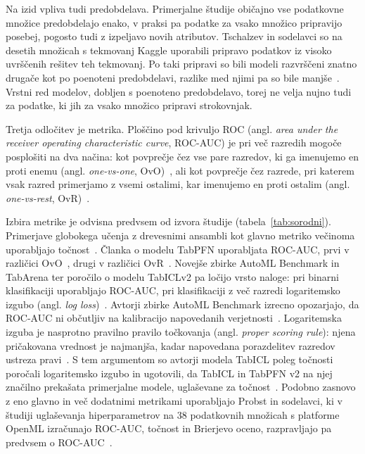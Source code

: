 \documentclass[a4paper,12pt,openright]{book}
\begin{document}
Na izid vpliva tudi predobdelava. Primerjalne študije običajno vse podatkovne
množice predobdelajo enako, v praksi pa podatke za vsako množico pripravijo
posebej, pogosto tudi z izpeljavo novih atributov. Tschalzev in sodelavci so
na desetih množicah s tekmovanj Kaggle uporabili pripravo podatkov iz visoko
uvrščenih rešitev teh tekmovanj. Po taki pripravi so bili modeli razvrščeni
znatno drugače kot po poenoteni predobdelavi, razlike med njimi pa so bile
manjše~\cite{tschalzev2024data}. Vrstni red modelov, dobljen s poenoteno
predobdelavo, torej ne velja nujno tudi za podatke, ki jih za vsako množico
pripravi strokovnjak.

Tretja odločitev je metrika. Ploščino pod krivuljo ROC (angl. \emph{area under the
receiver operating characteristic curve}, ROC-AUC) je pri več razredih mogoče
posplošiti na dva načina: kot povprečje čez vse pare razredov, ki ga
imenujemo en proti enemu (angl. \emph{one-vs-one}, OvO)~\cite{hand2001simple},
ali kot povprečje čez razrede, pri katerem vsak razred primerjamo z vsemi
ostalimi, kar imenujemo en proti ostalim (angl. \emph{one-vs-rest},
OvR)~\cite{fawcett2006introduction}.

Izbira metrike je odvisna predvsem od izvora študije
(tabela~\ref{tab:sorodni}).
Primerjave globokega učenja z drevesnimi ansambli kot glavno metriko večinoma
uporabljajo točnost~\cite{grinsztajn2022why,mcelfresh2023neural,ye2024closer}.
Članka o modelu TabPFN uporabljata ROC-AUC, prvi v različici
OvO~\cite{hollmann2023tabpfn}, drugi v različici
OvR~\cite{hollmann2025tabpfn}. Novejše zbirke AutoML Benchmark in TabArena ter
poročilo o modelu TabICLv2 pa ločijo vrsto naloge: pri binarni klasifikaciji
uporabljajo ROC-AUC, pri klasifikaciji z več razredi logaritemsko izgubo
(angl. \emph{log
loss})~\cite{gijsbers2024amlb,erickson2025tabarena,qu2026tabiclv2}. Avtorji
zbirke AutoML Benchmark izrecno opozarjajo, da ROC-AUC ni občutljiv na
kalibracijo napovedanih
verjetnosti~\cite{gijsbers2024amlb}. Logaritemska
izguba je nasprotno pravilno pravilo točkovanja (angl. \emph{proper scoring
rule}): njena pričakovana vrednost je najmanjša, kadar napovedana porazdelitev
razredov ustreza pravi~\cite{gneiting2007strictly}. S tem argumentom so avtorji
modela TabICL poleg točnosti poročali logaritemsko izgubo in ugotovili, da
TabICL in TabPFN v2 na njej značilno prekašata primerjalne modele, uglaševane
za točnost~\cite{qu2025tabicl}. Podobno zasnovo z eno glavno in več dodatnimi
metrikami uporabljajo Probst in sodelavci, ki v študiji uglaševanja
hiperparametrov na 38 podatkovnih množicah s platforme OpenML izračunajo
ROC-AUC, točnost in Brierjevo oceno, razpravljajo pa predvsem o
ROC-AUC~\cite{probst2019tunability}.
\end{document}

